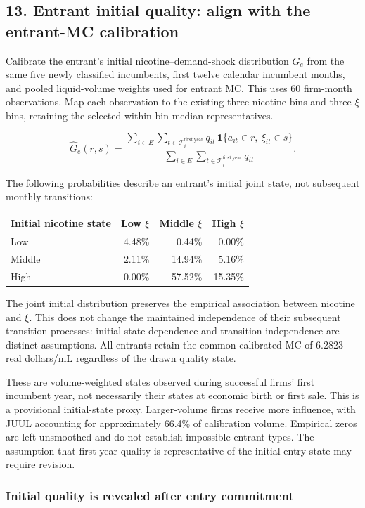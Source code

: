 \documentclass[10pt,]{article}
\begin{document}
\subsection{13. Entrant initial quality: align with the entrant-MC
calibration}\label{entrant-initial-quality-align-with-the-entrant-mc-calibration}

Calibrate the entrant's initial nicotine--demand-shock distribution
\(G_e\) from the same five newly classified incumbents, first twelve
calendar incumbent months, and pooled liquid-volume weights used for
entrant MC. This uses 60 firm-month observations. Map each observation
to the existing three nicotine bins and three \(\xi\) bins, retaining
the selected within-bin median representatives.

\[
\widehat G_e(r,s)=
\frac{\sum_{i\in E}\sum_{t\in\mathcal{T}_i^{\mathrm{first\ year}}}
q_{it}\,\mathbf{1}\{a_{it}\in r,\ \xi_{it}\in s\}}
{\sum_{i\in E}\sum_{t\in\mathcal{T}_i^{\mathrm{first\ year}}}q_{it}}.
\]

The following probabilities describe an entrant's initial joint state,
not subsequent monthly transitions:

\begin{longtable}[]{@{}lrrr@{}}
\toprule
Initial nicotine state & Low \(\xi\) & Middle \(\xi\) & High
\(\xi\)\tabularnewline
\midrule
\endhead
Low & 4.48\% & 0.44\% & 0.00\%\tabularnewline
Middle & 2.11\% & 14.94\% & 5.16\%\tabularnewline
High & 0.00\% & 57.52\% & 15.35\%\tabularnewline
\bottomrule
\end{longtable}

The joint initial distribution preserves the empirical association
between nicotine and \(\xi\). This does not change the maintained
independence of their subsequent transition processes: initial-state
dependence and transition independence are distinct assumptions. All
entrants retain the common calibrated MC of 6.2823 real dollars/mL
regardless of the drawn quality state.

These are volume-weighted states observed during successful firms' first
incumbent year, not necessarily their states at economic birth or first
sale. This is a provisional initial-state proxy. Larger-volume firms
receive more influence, with JUUL accounting for approximately 66.4\% of
calibration volume. Empirical zeros are left unsmoothed and do not
establish impossible entrant types. The assumption that first-year
quality is representative of the initial entry state may require
revision.

\subsubsection{Initial quality is revealed after entry
commitment}\label{initial-quality-is-revealed-after-entry-commitment}
\end{document}
